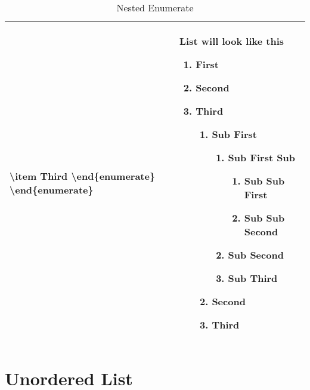 \documentclass[a4paper, 10pt]{book}
\begin{document}
\begin{table}[!h]
\begin{tabularx}{15cm}{|X|X|}
		\textbackslash item Third   \newline
		\textbackslash end\{enumerate\} \newline
		\textbackslash end\{enumerate\} \newline
		     &
		List will look like this
		\begin{enumerate}
			\item First
			\item Second
			\item Third
			      \begin{enumerate}
				      \item Sub First
				            \begin{enumerate}
					            \item Sub First Sub
					                  \begin{enumerate}
						                  \item Sub Sub First
						                  \item Sub Sub Second
					                  \end{enumerate}
					            \item Sub Second
					            \item Sub Third
				            \end{enumerate}
				      \item Second
				      \item Third
			      \end{enumerate}
		\end{enumerate}
		\\
		\hline
	\end{tabularx}
	\caption{Nested Enumerate}
\end{table}

\chapter[Unordered List]{Unordered List}
\end{document}
